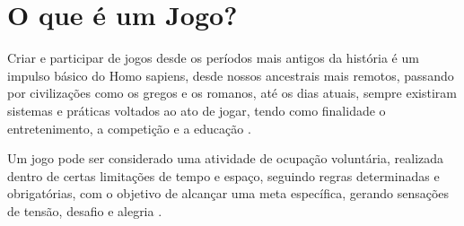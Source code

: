 \section{O que é um Jogo?}
Criar e participar de jogos desde os períodos mais
antigos da história é um impulso básico do Homo 
sapiens, desde nossos ancestrais mais remotos,
passando por civilizações como os gregos e os 
romanos, até os dias atuais, sempre existiram 
sistemas e práticas voltados ao ato de jogar, 
tendo como finalidade o entretenimento, a competição
e a educação \cite{egenfeldt2020understanding}.

Um jogo pode ser considerado uma atividade de ocupação
voluntária, realizada dentro de certas limitações de tempo
e espaço, seguindo regras determinadas e obrigatórias, 
com o objetivo de alcançar uma meta específica, gerando
sensações de tensão, desafio e alegria \cite{vasques2025jogar}.

